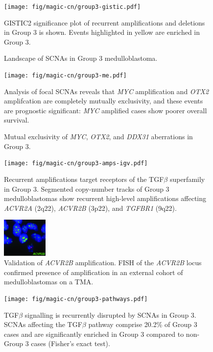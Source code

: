 \documentclass[11pt,letterpaper]{article}
\theoremstyle{definition}
\begin{document}
\clearpage

\begin{figure}[h]
	\begin{center}
		\texttt{[image: fig/magic-cn/group3-gistic.pdf]}
	\end{center}
	\caption{Landscape of SCNAs in Group 3 medulloblastoma.}
	GISTIC2 significance plot of recurrent amplifications and deletions in Group 3 is shown. Events highlighted in yellow are enriched in Group 3.
	\label{fig:group3-gistic}
\end{figure}

\clearpage

\begin{figure}[h]
	\begin{center}
		\texttt{[image: fig/magic-cn/group3-me.pdf]}
	\end{center}
	\caption{Mutual exclusivity of \emph{MYC}, \emph{OTX2}, and \emph{DDX31} aberrations in Group 3.}
	Analysis of focal SCNAs reveals that \emph{MYC} amplification and \emph{OTX2} amplifcation are completely mutually exclusivity, and these events are prognostic significant: \emph{MYC} amplified cases show poorer overall survival.
	\label{fig:group3-me}
\end{figure}

\begin{figure}
	\centering
	\texttt{[image: fig/magic-cn/group3-amps-igv.pdf]}
	\caption{Recurrent amplifications target receptors of the TGF$\beta$ superfamily in Group 3.
		Segmented copy-number tracks of Group 3 medulloblastomas show recurrent high-level amplifications affecting \emph{ACVR2A} (2q22), \emph{ACVR2B} (3p22), and \emph{TGFBR1} (9q22).}
	\label{fig:group3-amps-igv}
\end{figure}

\begin{figure}
	\centering
	\includegraphics[width=0.2\textwidth]{fig/magic-cn/acvr2b-fish.jpg}
	\caption{Validation of \emph{ACVR2B} amplification.
	FISH of the \emph{ACVR2B} locus confirmed presence of amplification in an external cohort of medulloblastomas on a TMA.}
	\label{fig:acvr2b-fish}
\end{figure}

\begin{figure}
	\centering
	\texttt{[image: fig/magic-cn/group3-pathways.pdf]}
	\caption{TGF$\beta$ signalling is recurrently disrupted by SCNAs in Group 3.
SCNAs affecting the TGF$\beta$ pathway comprise 20.2\% of Group 3 cases and are significantly enriched in Group 3 compared to non-Group 3 cases (Fisher’s exact test).}
	\label{fig:group3-pathways}
\end{figure}
\end{document}
